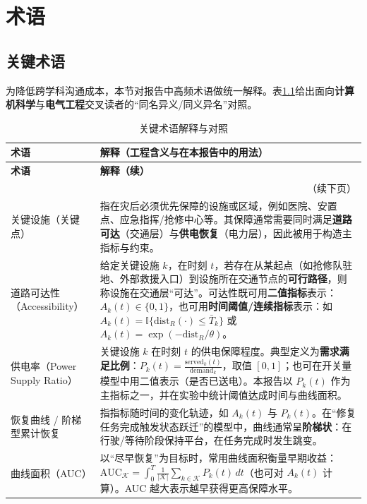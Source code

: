 \documentclass[UTF8,zihao=-4,a4paper,fontset=fandol]{ctexrep}
\begin{document}
\chapter{术语}
\section{关键术语}
为降低跨学科沟通成本，本节对报告中高频术语做统一解释。表\ref{tab:terms}给出面向\textbf{计算机科学}与\textbf{电气工程}交叉读者的“同名异义/同义异名”对照。

\begin{longtable}{p{}p{}}
\caption{关键术语解释与对照}\label{tab:terms}\\
\toprule
\textbf{术语} & \textbf{解释（工程含义与在本报告中的用法）}\\
\midrule
\endfirsthead
\toprule
\textbf{术语} & \textbf{解释（续）}\\
\midrule
\endhead
\midrule
\multicolumn{2}{r}{\small（续下页）}\\
\endfoot
\bottomrule
\endlastfoot

关键设施（关键点） & 指在灾后必须优先保障的设施或区域，例如医院、安置点、应急指挥/抢修中心等。其保障通常需要同时满足\textbf{道路可达}（交通层）与\textbf{供电恢复}（电力层），因此被用于构造主指标与约束。\\

道路可达性（Accessibility） & 给定关键设施 $k$，在时刻 $t$，若存在从某起点（如抢修队驻地、外部救援入口）到设施所在交通节点的\textbf{可行路径}，则称设施在交通层“可达”。可达性既可用\textbf{二值指标}表示：$A_k(t)\in\{0,1\}$，也可用\textbf{时间阈值/连续指标}表示：如 $A_k(t)=\mathbb{I}\{\text{dist}_R(\cdot)\le \bar{T}_k\}$ 或 $A_k(t)=\exp(-\text{dist}_R/\theta)$。\\

供电率（Power Supply Ratio） & 关键设施 $k$ 在时刻 $t$ 的供电保障程度。典型定义为\textbf{需求满足比例}：$P_k(t)=\frac{\text{served}_k(t)}{\text{demand}_k}$，取值 $[0,1]$；也可在开关量模型中用二值表示（是否已送电）。本报告以 $P_k(t)$ 作为主指标之一，并在实验中统计阈值达成时间与曲线面积。\\

恢复曲线 / 阶梯型累计恢复 & 指指标随时间的变化轨迹，如 $A_k(t)$ 与 $P_k(t)$。在“修复任务完成触发状态跃迁”的模型中，曲线通常呈\textbf{阶梯状}：在行驶/等待阶段保持平台，在任务完成时发生跳变。\\

曲线面积（AUC） & 以“尽早恢复”为目标时，常用曲线面积衡量早期收益：$\text{AUC}_{\mathcal{K}}=\int_0^T \frac{1}{|\mathcal{K}|}\sum_{k\in\mathcal{K}} P_k(t)\,dt$（也可对 $A_k(t)$ 计算）。AUC 越大表示越早获得更高保障水平。\\


\end{longtable}
\end{document}
